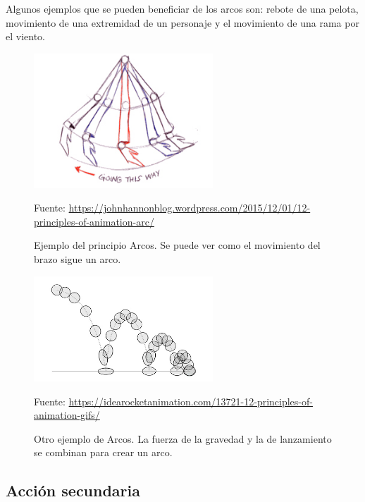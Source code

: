 \documentclass{article}
\begin{document}
\bigskip

Algunos ejemplos que se pueden beneficiar de los arcos son: rebote de una pelota, movimiento de una extremidad de un personaje y el movimiento de una rama por el viento.

\begin{figure}[H]
    \centering
    \includegraphics[width=0.6\textwidth]{imagenes/arm-arc.jpg}
    \caption{Ejemplo del principio Arcos. Se puede ver como el movimiento del brazo sigue un arco.}
    \vspace{10pt}
    \footnotesize{Fuente: \url{https://johnhannonblog.wordpress.com/2015/12/01/12-principles-of-animation-arc/}}
\end{figure}

\begin{figure}[H]
    \centering
    \includegraphics[width=0.6\textwidth]{imagenes/bouncing-ball.png}
    \caption{Otro ejemplo de Arcos. La fuerza de la gravedad y la de lanzamiento se combinan para crear un arco.}
    \vspace{10pt}
    \footnotesize{Fuente: \url{https://idearocketanimation.com/13721-12-principles-of-animation-gifs/}}
\end{figure}

\subsection{Acción secundaria}

\end{document}
